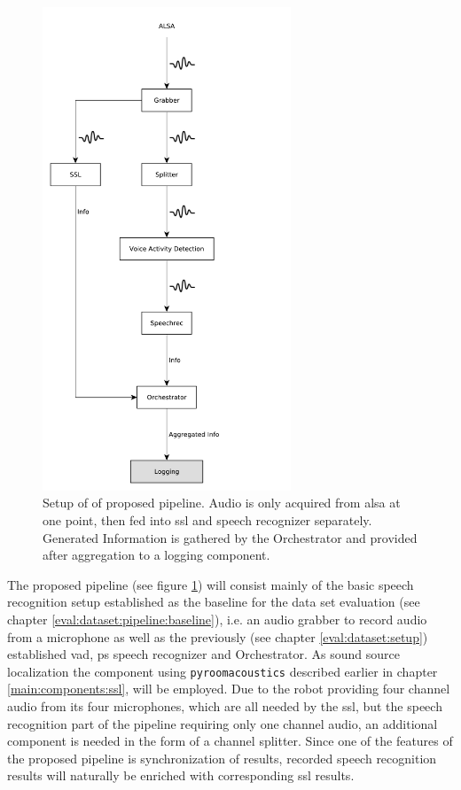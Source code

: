 \begin{figure}[]
	\centering
	\includegraphics[width=0.66\textwidth]{diagrams/eval_task_proposed.pdf}
	\caption{Setup of of proposed pipeline.
		Audio is only acquired from \gls{alsa} at one point, then fed into \gls{ssl} and speech recognizer separately.
		Generated Information is gathered by the Orchestrator and provided after aggregation to a logging component.}
	\label{pic:eval_task_setup_new}
\end{figure}

The proposed pipeline (see figure \ref{pic:eval_task_setup_new}) will consist mainly of the basic speech recognition setup established as the baseline for the data set evaluation (see chapter \ref{eval:dataset:pipeline:baseline}), i.e. an audio grabber to record audio from a microphone as well as the previously (see chapter \ref{eval:dataset:setup}) established \gls{vad}, \gls{ps} speech recognizer and Orchestrator.
As sound source localization the component using \texttt{pyroomacoustics} described earlier in chapter \ref{main:components:ssl}, will be employed.
Due to the robot providing four channel audio from its four microphones, which are all needed by the \gls{ssl}, but the speech recognition part of the pipeline requiring only one channel audio, an additional component is needed in the form of a channel splitter.
Since one of the features of the proposed pipeline is synchronization of results, recorded speech recognition results will naturally be enriched with corresponding \gls{ssl} results.


